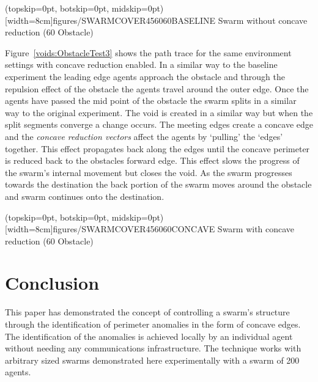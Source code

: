 \documentclass{ieeeaccess}
\begin{document}
\Figure[t!](topskip=0pt, botskip=0pt, midskip=0pt)[width=8cm]{figures/SWARMCOVER456060BASELINE}
{Swarm without concave reduction (60 Obstacle)\label{voids:ObstacleTest2}}


Figure~\ref{voids:ObstacleTest3} shows the path trace for the same environment settings with concave reduction enabled. In a similar way to the baseline experiment the leading edge agents approach the obstacle and through the repulsion effect of the obstacle the agents travel around the outer edge. Once the agents have passed the mid point of the obstacle the swarm splits in a similar way to the original experiment. The void is created in a similar way but when the split segments converge a change occurs. The meeting edges create a concave edge and the \textit{concave reduction vectors} affect the agents by `pulling' the `edges' together. This effect propagates back along the edges until the concave perimeter is reduced back to the obstacles forward edge. This effect slows the progress of the swarm's internal movement but closes the void. As the swarm progresses towards the destination the back portion of the swarm moves around the obstacle and swarm continues onto the destination.

\Figure[t!](topskip=0pt, botskip=0pt, midskip=0pt)[width=8cm]{figures/SWARMCOVER456060CONCAVE}
{Swarm with concave reduction (60 Obstacle)\label{voids:ObstacleTest3}}


\section{Conclusion}\label{voids:Conclusion}
This paper has demonstrated the concept of controlling a swarm's structure through the identification of perimeter anomalies in the form of concave edges. The identification of the anomalies is achieved locally by an individual agent without needing any communications infrastructure. The technique works with arbitrary sized swarms demonstrated here experimentally with a swarm of 200 agents.
\end{document}
